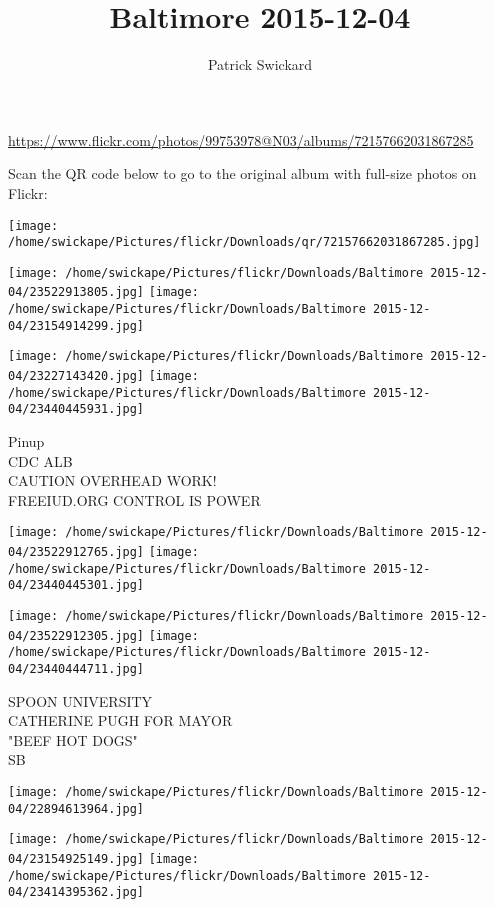\documentclass[10pt,letterpaper]{article}
\title{Baltimore 2015-12-04}
\author{Patrick Swickard}
\date{}
\begin{document}
\maketitle

\url{https://www.flickr.com/photos/99753978@N03/albums/72157662031867285}

Scan the QR code below to go to the original album with full-size photos on Flickr:

\texttt{[image: /home/swickape/Pictures/flickr/Downloads/qr/72157662031867285.jpg]}
\pagebreak

\texttt{[image: /home/swickape/Pictures/flickr/Downloads/Baltimore 2015-12-04/23522913805.jpg]}
\texttt{[image: /home/swickape/Pictures/flickr/Downloads/Baltimore 2015-12-04/23154914299.jpg]}

\texttt{[image: /home/swickape/Pictures/flickr/Downloads/Baltimore 2015-12-04/23227143420.jpg]}
\texttt{[image: /home/swickape/Pictures/flickr/Downloads/Baltimore 2015-12-04/23440445931.jpg]}

Pinup\\
CDC ALB\\
CAUTION OVERHEAD WORK!\\
FREEIUD.ORG CONTROL IS POWER
\pagebreak

\texttt{[image: /home/swickape/Pictures/flickr/Downloads/Baltimore 2015-12-04/23522912765.jpg]}
\texttt{[image: /home/swickape/Pictures/flickr/Downloads/Baltimore 2015-12-04/23440445301.jpg]}

\texttt{[image: /home/swickape/Pictures/flickr/Downloads/Baltimore 2015-12-04/23522912305.jpg]}
\texttt{[image: /home/swickape/Pictures/flickr/Downloads/Baltimore 2015-12-04/23440444711.jpg]}

SPOON UNIVERSITY\\
CATHERINE PUGH FOR MAYOR\\
"BEEF HOT DOGS"\\
SB
\pagebreak

\texttt{[image: /home/swickape/Pictures/flickr/Downloads/Baltimore 2015-12-04/22894613964.jpg]}

\vspace{0.25in}
\texttt{[image: /home/swickape/Pictures/flickr/Downloads/Baltimore 2015-12-04/23154925149.jpg]}
\texttt{[image: /home/swickape/Pictures/flickr/Downloads/Baltimore 2015-12-04/23414395362.jpg]}
\end{document}
